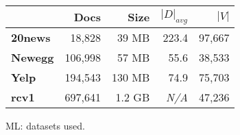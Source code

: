 \begin{figure}
\centering
{\small
\begin{tabular}{|l|r|r|r|r|}
    \hline & \textbf{Docs} & \textbf{Size} & \textbf{$|D|_{avg}$} & \textbf{$|V|$} \\
    \hline
    \textbf{20news}  & 18,828     & 39 MB  & 223.4      & 97,667     \\
    \textbf{Newegg}  & 106,998    & 57 MB  & 55.6       & 38,533     \\
    \textbf{Yelp}    & 194,543    & 130 MB & 74.9       & 75,703 \\
    \textbf{rcv1}    & 697,641    & 1.2 GB & \emph{N/A} & 47,236 \\
    \hline
\end{tabular}
}
\caption{ML: datasets used.}
\label{fig:ml-datasets}
\end{figure}
